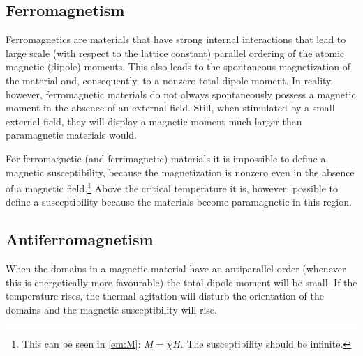 \subsection{Ferromagnetism}

    Ferromagnetics are materials that have strong internal interactions that lead to large scale (with respect to the lattice constant) parallel ordering of the atomic magnetic (dipole) moments. This also leads to the spontaneous magnetization of the material and, consequently, to a nonzero total dipole moment. In reality, however, ferromagnetic materials do not always spontaneously possess a magnetic moment in the absence of an external field. Still, when stimulated by a small external field, they will display a magnetic moment much larger than paramagnetic materials would.



    \begin{remark}
        For ferromagnetic (and ferrimagnetic) materials it is impossible to define a magnetic susceptibility, because the magnetization is nonzero even in the absence of a magnetic field.\footnote{This can be seen in \cref{em:M}: $M=\chi H$. The susceptibility should be infinite.} Above the critical temperature it is, however, possible to define a susceptibility because the materials become paramagnetic in this region.
    \end{remark}

\subsection{Antiferromagnetism}

    When the domains in a magnetic material have an antiparallel order (whenever this is energetically more favourable) the total dipole moment will be small. If the temperature rises, the thermal agitation will disturb the orientation of the domains and the magnetic susceptibility will rise.

